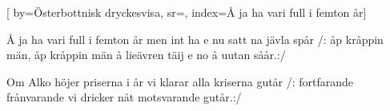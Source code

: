 

[ 		%
	by={Österbottnisk dryckesvisa},					%
	sr={},					%
	index={Å ja ha vari full i femton år}]						%
	


\beginverse*						%
Å ja ha vari full i femton år
men int ha e nu satt na jävla spår
/: åp kråppin män, åp kråppin män
å lieävren täij e no å uutan såår.:/
\endverse							%

\beginverse*						%
Om Alko höjer priserna i år
vi klarar alla kriserna gutår
/: fortfarande frånvarande
vi dricker nåt motsvarande gutår.:/
\endverse

\endsong							%